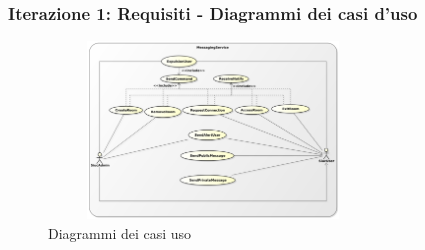 \documentclass[t]{beamer} %
\begin{document}
\begin{frame}
  \frametitle{Iterazione 1: Requisiti - Diagrammi dei casi d'uso}
   \begin{figure}[h]
    \includegraphics[height=178px, width=330px]{image_astah/UseCaseDiagram.png}{\centering}
    \caption{Diagrammi dei casi uso} 
    \label{fig_UCD}
   \end{figure}
\end{frame}
\end{document}
